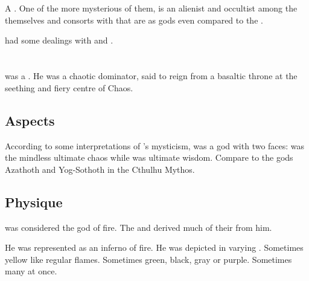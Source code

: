 \section{\NerrhanKoss}
\index{\NerrhanKoss}
A \xs. 
One of the more mysterious of them, \NerrhanKoss{} is an alienist and occultist among the \xss{} themselves and consorts with  that are as gods even compared to the \xss. 

\NerrhanKoss{} had some dealings with \QuessanthIshnaruchaefir{} and . 















\section{\RuinSatha}
\index{\RuinSatha}
\RuinSatha was a \xs. 
He was a chaotic dominator, said to reign from a basaltic throne at the seething and fiery centre of Chaos.









\subsection{Aspects}
According to some interpretations of \Sethicus's mysticism, \RuinSatha was a god with two faces:
\Ruin was the mindless ultimate chaos while \Satha was ultimate wisdom.
Compare to the gods Azathoth and Yog-Sothoth in the Cthulhu Mythos.









\subsection{Physique}
\RuinSatha was considered the \xs god of fire. 
The \dragons and \rethyaxes derived much of their  from him. 

He was represented as an inferno of fire. 
He was depicted in varying \colours.
Sometimes yellow like regular flames. 
Sometimes green, black, gray or purple. 
Sometimes many \colours at once. 

